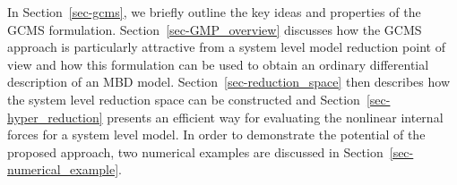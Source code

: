 In Section~\ref{sec-gcms}, we briefly outline the key ideas and properties of the GCMS formulation. 
Section~\ref{sec-GMP_overview} discusses how the GCMS approach is particularly attractive from a system level model reduction point of view and how this formulation can be used to obtain an ordinary differential description of an MBD model. Section~\ref{sec-reduction_space} then describes how the system level reduction space can be constructed and Section~\ref{sec-hyper_reduction} presents an efficient way for evaluating the nonlinear internal forces for a system level model. 
In order to demonstrate the potential of the proposed approach, two numerical examples are discussed in Section~\ref{sec-numerical_example}.

